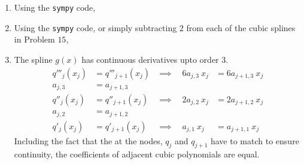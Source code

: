 \begin{enumerate}
    \item Using the \texttt{sympy} code,
          \begin{figure}[H]
              \centering
          \end{figure}

    \item Using the \texttt{sympy} code, or simply subtracting $ 2 $ from each of the
          cubic splines in Problem $ 15 $,
          \begin{figure}[H]
              \centering
          \end{figure}

    \item The spline $ g(x) $ has continuous derivatives upto order $ 3 $.
          \begin{align}
              q'''_j(x_j)                  & = q'''_{j+1}(x_j)  &
              \implies \quad 6a_{j,3}\ x_j & = 6a_{j+1,3}\ x_j    \\
              a_{j,3}                      & = a_{j+1,3}          \\
              q''_j(x_j)                   & = q''_{j+1}(x_j)   &
              \implies \quad 2a_{j,2}\ x_j & = 2a_{j+1, 2}\ x_j   \\
              a_{j,2}                      & = a_{j+1,2}          \\
              q'_j(x_j)                    & = q'_{j+1}(x_j)    &
              \implies \quad a_{j,1}\ x_j  & = a_{j+1, 1}\ x_j
          \end{align}
          Including the fact that the at the nodes, $ q_j $ and $ q_{j+1} $ have to match
          to ensure continuity, the coefficients of adjacent cubic polynomials are equal.


\end{enumerate}
